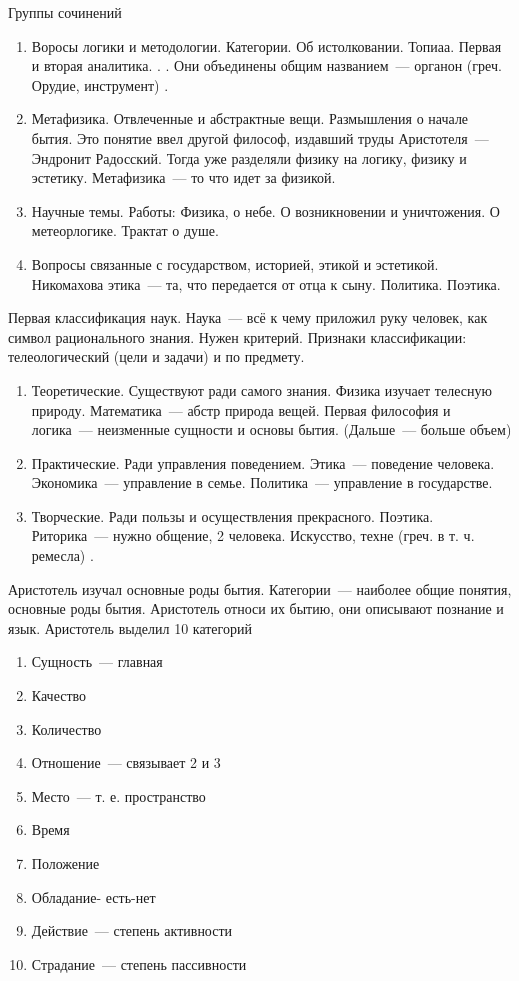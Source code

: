 
Группы сочинений

\begin{enumerate}
	\item Воросы логики и методологии. Категории. Об истолковании. Топиаа. Первая и вторая аналитика. . . Они объединены общим названием~--- органон (греч. Орудие, инструмент) . 
	\item Метафизика. Отвлеченные и абстрактные вещи. Размышления о начале бытия. Это понятие ввел другой философ, издавший труды Аристотеля~--- Эндронит Радосский. Тогда уже разделяли физику на логику, физику и эстетику. Метафизика~--- то что идет за физикой. 
	\item Научные темы. Работы: Физика, о небе. О возникновении и уничтожения. О метеорлогике. Трактат о душе. 
	\item Вопросы связанные с государством, историей, этикой и эстетикой. Никомахова этика~--- та, что передается от отца к сыну. Политика. Поэтика. 
\end{enumerate}

Первая классификация наук. Наука~--- всё к чему приложил руку человек, как символ рационального знания. Нужен критерий. Признаки классификации: телеологический (цели и задачи) и по предмету. 

	
\begin{enumerate}
	\item Теоретические. Существуют ради самого знания. Физика изучает телесную природу. Математика~--- абстр природа вещей. Первая философия и логика~--- неизменные сущности и основы бытия. (Дальше~--- больше объем) 
	\item Практические. Ради управления поведением. Этика~--- поведение человека. Экономика~--- управление в семье. Политика~--- управление в государстве. 
	\item Творческие. Ради пользы и осуществления прекрасного. Поэтика. Риторика~--- нужно общение, 2 человека. Искусство, техне (греч. в т. ч. ремесла) . 
\end{enumerate}

Аристотель изучал основные роды бытия. Категории~--- наиболее общие понятия, основные роды бытия. Аристотель относи их бытию, они описывают познание и язык. 
Аристотель выделил 10 категорий

\begin{enumerate}
	\item Сущность~--- главная
	\item Качество
	\item Количество
	\item Отношение~--- связывает 2 и 3
	\item Место~--- т. е. пространство
	\item Время
	\item Положение
	\item Обладание- есть-нет
	\item Действие~--- степень активности
	\item Страдание~--- степень пассивности
\end{enumerate}

